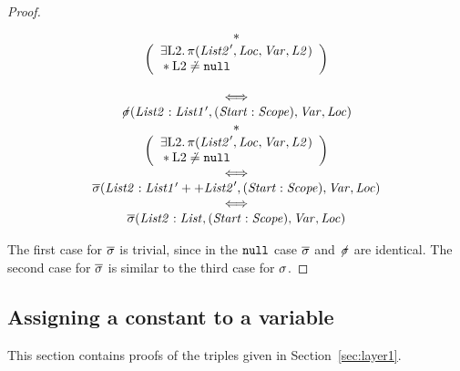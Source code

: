 \documentclass{article}
\newcommand{\iflong}[1]{#1}
\begin{document}
\begin{lemma}
\begin{proof}
\[\begin{array}{c}
  \mathbin{*} \\
  \left(\begin{array}{l}
          \exists{\ensuremath{\mathrm{L2}}}\mathpunct{.}\pi({\mathit{List2}}',{\mathit{Loc}},{\mathit{Var}},{\mathit{L2}})\\
          {}\mathbin{*}{\mathrm{L2}}\not\doteq\mbox{\texttt{{\upshape null}}} 
  \end{array}\right) \\\\
  \iff \\
  {\not\!\sigma}({\mathit{List2}}:{\mathit{List1'}},({\mathit{Start}}:{\mathit{Scope}}),{\mathit{Var}},{\mathit{Loc}})\\
  \mathbin{*} \\
  \left(\begin{array}{l}
          \exists{\ensuremath{\mathrm{L2}}}\mathpunct{.}\pi({\mathit{List2}}',{\mathit{Loc}},{\mathit{Var}},{\mathit{L2}})\\
          {}\mathbin{*}{\mathrm{L2}}\not\doteq\mbox{\texttt{{\upshape null}}} 
  \end{array}\right) \\
  \iff \\
  \overline{\sigma}({\mathit{List2}}:{\mathit{List1'}}++{\mathit{List2}}',({\mathit{Start}}:{\mathit{Scope}}),{\mathit{Var}},{\mathit{Loc}})\\
  \iff \\
  \overline{\sigma}({\mathit{List2}}:{\mathit{List}},({\mathit{Start}}:{\mathit{Scope}}),{\mathit{Var}},{\mathit{Loc}})\\
\end{array}
\]
                
The first case for $\overline{\sigma}$ is trivial, since in the $\mbox{\texttt{{\upshape null}}}$ case $\overline{\sigma}$ and ${\not\!\sigma}$ are identical. The second case for $\overline{\sigma}$ is similar to the third case for $\sigma$.
        \end{proof}
\end{lemma}

\subsection{Assigning a constant to a variable}
\label{sec:constantvar}

\iflong{This section contains proofs of the triples given in Section~\ref{sec:layer1}.}
\end{document}
